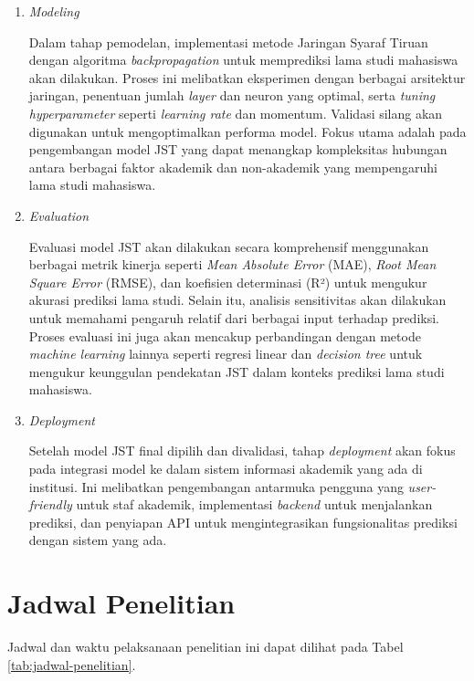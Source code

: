 \begin{enumerate}
    \item \textit{Modeling}
    
    Dalam tahap pemodelan, implementasi metode Jaringan Syaraf Tiruan dengan algoritma \textit{backpropagation} untuk memprediksi lama studi mahasiswa akan dilakukan. Proses ini melibatkan eksperimen dengan berbagai arsitektur jaringan, penentuan jumlah \textit{layer} dan neuron yang optimal, serta \textit{tuning hyperparameter} seperti \textit{learning rate} dan momentum. Validasi silang akan digunakan untuk mengoptimalkan performa model. Fokus utama adalah pada pengembangan model JST yang dapat menangkap kompleksitas hubungan antara berbagai faktor akademik dan non-akademik yang mempengaruhi lama studi mahasiswa.

    \item \textit{Evaluation}
    
    Evaluasi model JST akan dilakukan secara komprehensif menggunakan berbagai metrik kinerja seperti \textit{Mean Absolute Error} (MAE), \textit{Root Mean Square Error} (RMSE), dan koefisien determinasi (R²) untuk mengukur akurasi prediksi lama studi. Selain itu, analisis sensitivitas akan dilakukan untuk memahami pengaruh relatif dari berbagai input terhadap prediksi. Proses evaluasi ini juga akan mencakup perbandingan dengan metode \textit{machine learning} lainnya seperti regresi linear dan \textit{decision tree} untuk mengukur keunggulan pendekatan JST dalam konteks prediksi lama studi mahasiswa.

    \item \textit{Deployment}
    
    Setelah model JST final dipilih dan divalidasi, tahap \textit{deployment} akan fokus pada integrasi model ke dalam sistem informasi akademik yang ada di institusi. Ini melibatkan pengembangan antarmuka pengguna yang \textit{user-friendly} untuk staf akademik, implementasi \textit{backend} untuk menjalankan prediksi, dan penyiapan API untuk mengintegrasikan fungsionalitas prediksi dengan sistem yang ada.
\end{enumerate}

\clearpage
\section{Jadwal Penelitian}

Jadwal dan waktu pelaksanaan penelitian ini dapat dilihat pada Tabel \ref{tab:jadwal-penelitian}. 

